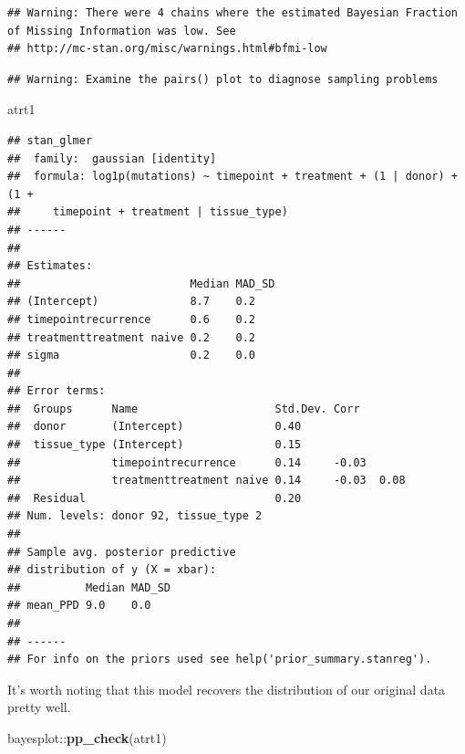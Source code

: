 \documentclass[]{article}
\newenvironment{Shaded}{\begin{snugshade}}{\end{snugshade}}
\newcommand{\KeywordTok}[1]{\textcolor[rgb]{0.13,0.29,0.53}{\textbf{{#1}}}}
\newcommand{\NormalTok}[1]{{#1}}
\begin{document}
\begin{verbatim}
## Warning: There were 4 chains where the estimated Bayesian Fraction of Missing Information was low. See
## http://mc-stan.org/misc/warnings.html#bfmi-low
\end{verbatim}

\begin{verbatim}
## Warning: Examine the pairs() plot to diagnose sampling problems
\end{verbatim}

\begin{Shaded}
\begin{Highlighting}[]
\NormalTok{atrt1}
\end{Highlighting}
\end{Shaded}

\begin{verbatim}
## stan_glmer
##  family:  gaussian [identity]
##  formula: log1p(mutations) ~ timepoint + treatment + (1 | donor) + (1 + 
##     timepoint + treatment | tissue_type)
## ------
## 
## Estimates:
##                          Median MAD_SD
## (Intercept)              8.7    0.2   
## timepointrecurrence      0.6    0.2   
## treatmenttreatment naive 0.2    0.2   
## sigma                    0.2    0.0   
## 
## Error terms:
##  Groups      Name                     Std.Dev. Corr       
##  donor       (Intercept)              0.40                
##  tissue_type (Intercept)              0.15                
##              timepointrecurrence      0.14     -0.03      
##              treatmenttreatment naive 0.14     -0.03  0.08
##  Residual                             0.20                
## Num. levels: donor 92, tissue_type 2 
## 
## Sample avg. posterior predictive 
## distribution of y (X = xbar):
##          Median MAD_SD
## mean_PPD 9.0    0.0   
## 
## ------
## For info on the priors used see help('prior_summary.stanreg').
\end{verbatim}

It's worth noting that this model recovers the distribution of our
original data pretty well.

\begin{Shaded}
\begin{Highlighting}[]
\NormalTok{bayesplot::}\KeywordTok{pp_check}\NormalTok{(atrt1)}
\end{Highlighting}
\end{Shaded}
\end{document}
